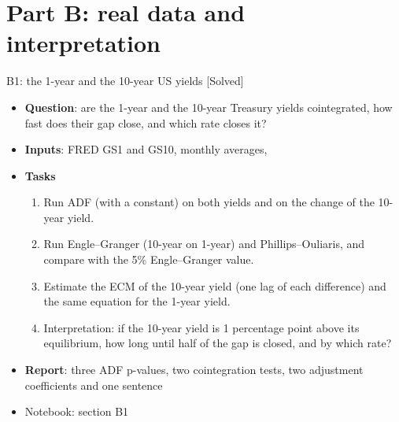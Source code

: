 \section{Part B: real data and interpretation}

\begin{frame}{B1: the 1-year and the 10-year US yields [Solved]}
\itemsize{\footnotesize}
\begin{itemize}
\item \textbf{Question}: are the 1-year and the 10-year Treasury yields cointegrated, how fast does their gap close, and which rate closes it?
\item \textbf{Inputs}: FRED GS1 and GS10, monthly averages, %
\item \textbf{Tasks}
\begin{enumerate}
    \item Run ADF (with a constant) on both yields and on the change of the 10-year yield.
    \item Run Engle--Granger (10-year on 1-year) and Phillips--Ouliaris, and compare with the 5\% Engle--Granger value.
    \item Estimate the ECM of the 10-year yield (one lag of each difference) and the same equation for the 1-year yield.
    \item Interpretation: if the 10-year yield is 1 percentage point above its equilibrium, how long until half of the gap is closed, and by which rate?
\end{enumerate}
\item \textbf{Report}: three ADF p-values, two cointegration tests, two adjustment coefficients and one sentence
\item Notebook: section B1
\end{itemize}
\end{frame}

